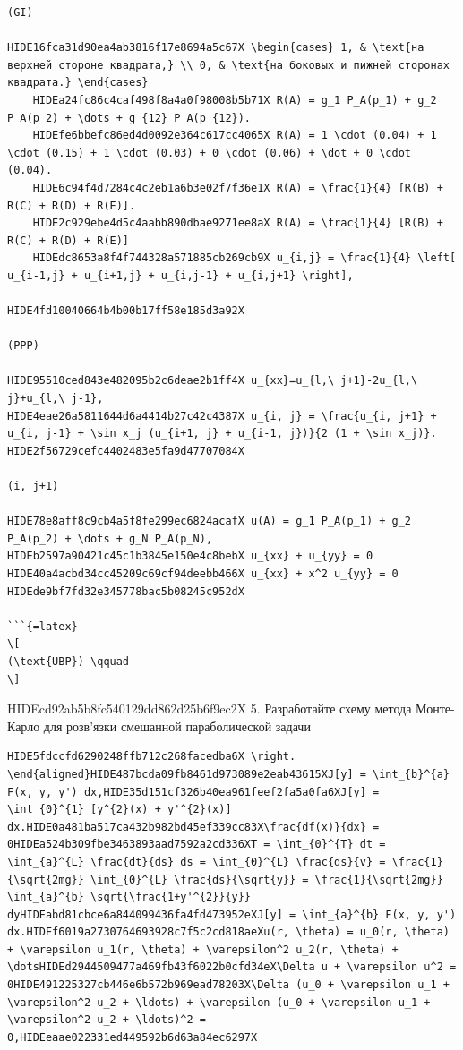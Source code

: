 \documentclass[
  ukrainian,
]{article}
\begin{document}
\begin{verbatim}
(GI)

HIDE16fca31d90ea4ab3816f17e8694a5c67X \begin{cases} 1, & \text{на верхней стороне квадрата,} \\ 0, & \text{на боковых и пижней сторонах квадрата.} \end{cases}
    HIDEa24fc86c4caf498f8a4a0f98008b5b71X R(A) = g_1 P_A(p_1) + g_2 P_A(p_2) + \dots + g_{12} P_A(p_{12}).
    HIDEfe6bbefc86ed4d0092e364c617cc4065X R(A) = 1 \cdot (0.04) + 1 \cdot (0.15) + 1 \cdot (0.03) + 0 \cdot (0.06) + \dot + 0 \cdot (0.04).
    HIDE6c94f4d7284c4c2eb1a6b3e02f7f36e1X R(A) = \frac{1}{4} [R(B) + R(C) + R(D) + R(E)].
    HIDE2c929ebe4d5c4aabb890dbae9271ee8aX R(A) = \frac{1}{4} [R(B) + R(C) + R(D) + R(E)]
    HIDEdc8653a8f4f744328a571885cb269cb9X u_{i,j} = \frac{1}{4} \left[ u_{i-1,j} + u_{i+1,j} + u_{i,j-1} + u_{i,j+1} \right],

HIDE4fd10040664b4b00b17ff58e185d3a92X

(PPP)

HIDE95510ced843e482095b2c6deae2b1ff4X u_{xx}=u_{l,\ j+1}-2u_{l,\ j}+u_{l,\ j-1},
HIDE4eae26a5811644d6a4414b27c42c4387X u_{i, j} = \frac{u_{i, j+1} + u_{i, j-1} + \sin x_j (u_{i+1, j} + u_{i-1, j})}{2 (1 + \sin x_j)}.
HIDE2f56729cefc4402483e5fa9d47707084X

(i, j+1)

HIDE78e8aff8c9cb4a5f8fe299ec6824acafX u(A) = g_1 P_A(p_1) + g_2 P_A(p_2) + \dots + g_N P_A(p_N),
HIDEb2597a90421c45c1b3845e150e4c8bebX u_{xx} + u_{yy} = 0
HIDE40a4acbd34cc45209c69cf94deebb466X u_{xx} + x^2 u_{yy} = 0
HIDEde9bf7fd32e345778bac5b08245c952dX

```{=latex}
\[
(\text{UBP}) \qquad
\]
\end{verbatim}

HIDEcd92ab5b8fc540129dd862d25b6f9ec2X 5. Разработайте схему метода
Монте-Карло для розв'язки смешанной параболической задачи

\begin{verbatim}
HIDE5fdccfd6290248ffb712c268facedba6X \right. \end{aligned}HIDE487bcda09fb8461d973089e2eab43615XJ[y] = \int_{b}^{a} F(x, y, y') dx,HIDE35d151cf326b40ea961feef2fa5a0fa6XJ[y] = \int_{0}^{1} [y^{2}(x) + y'^{2}(x)] dx.HIDE0a481ba517ca432b982bd45ef339cc83X\frac{df(x)}{dx} = 0HIDEa524b309fbe3463893aad7592a2cd336XT = \int_{0}^{T} dt = \int_{a}^{L} \frac{dt}{ds} ds = \int_{0}^{L} \frac{ds}{v} = \frac{1}{\sqrt{2mg}} \int_{0}^{L} \frac{ds}{\sqrt{y}} = \frac{1}{\sqrt{2mg}} \int_{a}^{b} \sqrt{\frac{1+y'^{2}}{y}} dyHIDEabd81cbce6a844099436fa4fd473952eXJ[y] = \int_{a}^{b} F(x, y, y') dx.HIDEf6019a2730764693928c7f5c2cd818aeXu(r, \theta) = u_0(r, \theta) + \varepsilon u_1(r, \theta) + \varepsilon^2 u_2(r, \theta) + \dotsHIDEd2944509477a469fb43f6022b0cfd34eX\Delta u + \varepsilon u^2 = 0HIDE491225327cb446e6b572b969ead78203X\Delta (u_0 + \varepsilon u_1 + \varepsilon^2 u_2 + \ldots) + \varepsilon (u_0 + \varepsilon u_1 + \varepsilon^2 u_2 + \ldots)^2 = 0,HIDEeaae022331ed449592b6d63a84ec6297X
\end{verbatim}
\end{document}

